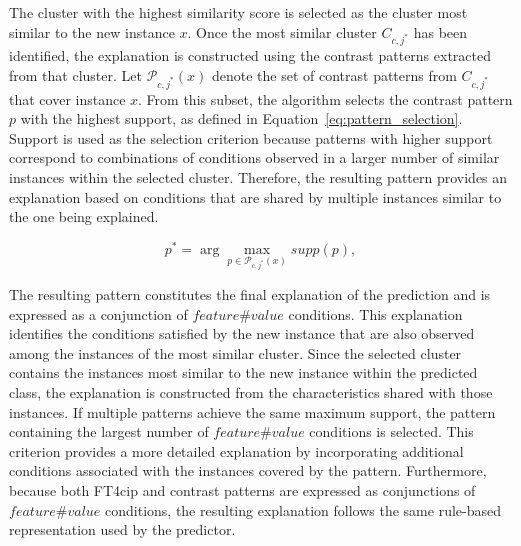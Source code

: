 {	The cluster with the highest similarity score is selected as the cluster most similar to the new instance $x$. Once the most similar cluster $C_{c,j^*}$ has been identified, the explanation is constructed using the contrast patterns extracted from that cluster. Let $\mathcal{P}_{c,j^*}(x)$ denote the set of contrast patterns from $C_{c,j^*}$ that cover instance $x$. From this subset, the algorithm selects the contrast pattern $p$ with the highest support, as defined in Equation~\ref{eq:pattern_selection}. Support is used as the selection criterion because patterns with higher support correspond to combinations of conditions observed in a larger number of similar instances within the selected cluster. Therefore, the resulting pattern provides an explanation based on conditions that are shared by multiple instances similar to the one being explained.
	
	\begin{equation}
		p^* = \arg\max_{p \in \mathcal{P}_{c,j^*}(x)} supp(p),
		\label{eq:pattern_selection}
	\end{equation}
	
	The resulting pattern constitutes the final explanation of the prediction and is expressed as a conjunction of $feature\#value$ conditions. This explanation identifies the conditions satisfied by the new instance that are also observed among the instances of the most similar cluster. Since the selected cluster contains the instances most similar to the new instance within the predicted class, the explanation is constructed from the characteristics shared with those instances. If multiple patterns achieve the same maximum support, the pattern containing the largest number of $feature\#value$ conditions is selected. This criterion provides a more detailed explanation by incorporating additional conditions associated with the instances covered by the pattern. Furthermore, because both FT4cip and contrast patterns are expressed as conjunctions of $feature\#value$ conditions, the resulting explanation follows the same rule-based representation used by the predictor.
	
}